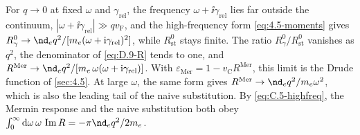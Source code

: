 For $q \to 0$ at fixed $\omega$ and $\gamma_{\mathrm{rel}}$, the frequency $\omega + \ii\gamma_{\mathrm{rel}}$ lies far outside the continuum, $|\omega + \ii\gamma_{\mathrm{rel}}| \gg qv_{\mathrm{F}}$, and the high-frequency form \cref{eq:4.5-moments} gives $R^0_\gamma \to \nd_eq^2/[m_e(\omega + \ii\gamma_{\mathrm{rel}})^2]$, while $R^0_{\mathrm{st}}$ stays finite. The ratio $R^0_\gamma/R^0_{\mathrm{st}}$ vanishes as $q^2$, the denominator of \cref{eq:D.9-R} tends to one, and $R^{\mathrm{Mer}} \to \nd_eq^2/[m_e\,\omega(\omega + \ii\gamma_{\mathrm{rel}})]$. With $\varepsilon_{\mathrm{Mer}} = 1 - v_{\mathrm{C}}R^{\mathrm{Mer}}$, this limit is the Drude function of \cref{sec:4.5}. At large $\omega$, the same form gives $R^{\mathrm{Mer}} \to \nd_eq^2/m_e\omega^2$, which is also the leading tail of the naive substitution. By \cref{eq:C.5-highfreq}, the Mermin response and the naive substitution both obey $\int_0^\infty\dd\omega\,\omega\,\Imag R = -\pi\nd_eq^2/2m_e$.
